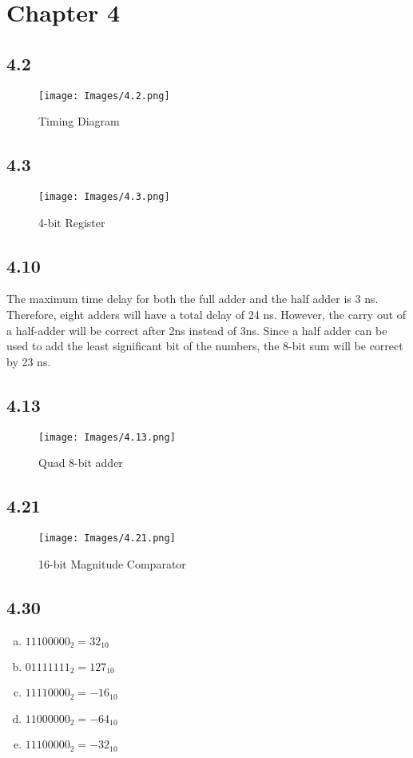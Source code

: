 \section*{Chapter 4}
\subsection*{4.2}
\begin{figure}[!ht]
    \centering
    \texttt{[image: Images/4.2.png]}
    \caption{Timing Diagram}
\end{figure}

\clearpage
\subsection*{4.3}
\begin{figure}[!ht]
    \centering
    \texttt{[image: Images/4.3.png]}
    \caption{4-bit Register}
\end{figure}

\subsection*{4.10}
The maximum time delay for both the full adder and the half adder is 3 ns. Therefore, eight adders will have a total delay of 24 ns. However, the carry out of a half-adder will be correct after 2ns instead of 3ns. Since a half adder can be used to add the least significant bit of the numbers, the 8-bit sum will be correct by 23 ns.

\subsection*{4.13}
\begin{figure}[!ht]
    \centering
    \texttt{[image: Images/4.13.png]}
    \caption{Quad 8-bit adder}
\end{figure}

\clearpage
\subsection*{4.21}
\begin{figure}[!ht]
    \centering
    \texttt{[image: Images/4.21.png]}
    \caption{16-bit Magnitude Comparator}
\end{figure}

\subsection*{4.30}
\begin{enumerate}[(a)]
    \item $11100000_2=32_{10}$
    \item $01111111_2=127_{10}$
    \item $11110000_2=-16_{10}$
    \item $11000000_2=-64_{10}$
    \item $11100000_2=-32_{10}$
\end{enumerate}

